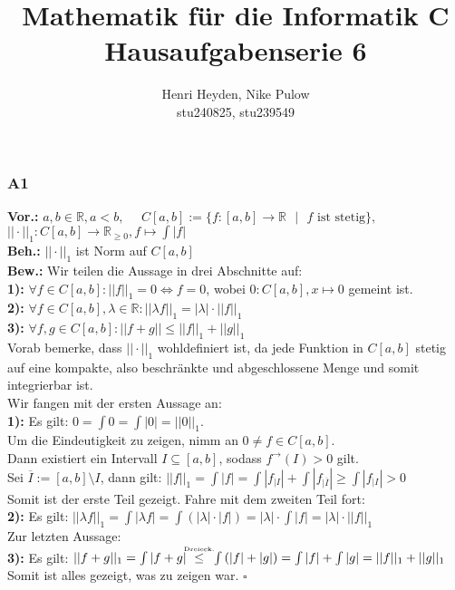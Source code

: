 \documentclass[12pt, a4paper]{article}
\title{Mathematik für die Informatik C\\Hausaufgabenserie 6}
\author{Henri Heyden, Nike Pulow \\ \small stu240825, stu239549}
\date{}
\newcommand*{\qed}{\null\nobreak\hfill\ensuremath{\square}}
\newcommand*{\puffer}{\text{ }\text{ }\text{ }\text{ }}
\newcommand*{\gap}{\text{ }}
\newcommand*{\setDef}{\gap|\gap}
\newcommand*{\vor}{\textbf{Vor.:} \gap}
\newcommand*{\beh}{\textbf{Beh.:} \gap}
\newcommand*{\bew}{\textbf{Bew.:} \gap}
\newcommand*{\R}{\mathbb R}
\newcommand{\dr}{\mathrel{\stackrel{\makebox[0pt]{\mbox{\normalfont\tiny Dreieck.}}}{\le}}}
\begin{document}
\maketitle

\doublespacing
\subsubsection*{A1}
\vor \(a,b \in \R, a < b, \gap \gap C[a,b] := \{f:[a,b] \rightarrow \R \setDef f \text{ ist stetig}\},\) \\
\puffer\puffer\gap\(||\cdot||_1 : C[a,b] \rightarrow \R_{\ge 0}, f \mapsto \int |f|\) \\
\beh \(||\cdot||_1\) ist Norm auf \(C[a,b]\) \\
\bew Wir teilen die Aussage in drei Abschnitte auf: \\
\textbf{1):} \(\forall f \in C[a,b]: ||f||_1 = 0 \Leftrightarrow f = 0\), wobei \(0 : C[a,b], x \mapsto 0\) gemeint ist. \\
\textbf{2):} \(\forall f \in C[a,b], \lambda \in \R: ||\lambda f||_1 = |\lambda| \cdot ||f||_1\) \\
\textbf{3):} \(\forall f,g \in C[a,b]: ||f + g|| \le ||f||_1 + ||g||_1\) \\
Vorab bemerke, dass \(||\cdot||_1\) wohldefiniert ist, da jede Funktion in \(C[a,b]\) stetig auf eine kompakte, also beschränkte und abgeschlossene Menge und somit integrierbar ist. \\
Wir fangen mit der ersten Aussage an: \\
\textbf{1):} Es gilt: \(0 = \int 0 = \int |0| = ||0||_1\).\\
Um die Eindeutigkeit zu zeigen, nimm an \(0 \ne f \in C[a,b]\). \\
Dann existiert ein Intervall \(I \subseteq [a,b]\), sodass \(f^\rightarrow(I) > 0\) gilt.\\
Sei \(\overline{I} := [a,b] \setminus I\), dann gilt:
\(||f||_1 = \int|f| = \int|f_{|I}| + \int|f_{|\overline{I}}| \ge \int|f_{|I}| > 0\) \\
Somit ist der erste Teil gezeigt. Fahre mit dem zweiten Teil fort:\\
\textbf{2):} Es gilt: \(||\lambda f||_1 = \int|\lambda f| = \int \left(|\lambda| \cdot |f|\right) = |\lambda| \cdot \int |f| = |\lambda| \cdot ||f||_1\)\\ Zur letzten Aussage: \\
\textbf{3):} Es gilt: \(||f + g||_1 = \int|f + g| \gap \dr \gap \int\left(|f| + |g|\right) = \int|f| + \int|g| = ||f||_1 + ||g||_1\) \\
Somit ist alles gezeigt, was zu zeigen war. \qed
\pagebreak
\end{document}
